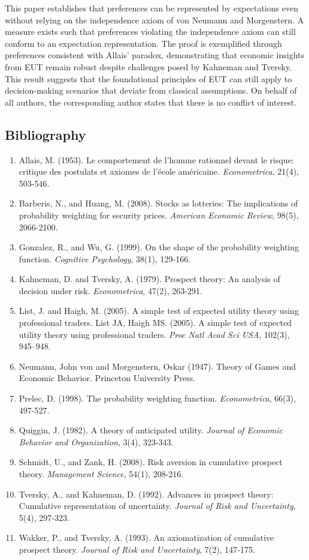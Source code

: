 \documentclass{article}
\begin{document}
This paper establishes that preferences can be represented by expectations even without relying on the independence axiom of von Neumann and Morgenstern. A measure exists such that preferences violating the independence axiom can still conform to an expectation representation. The proof is exemplified through preferences consistent with Allais' paradox, demonstrating that economic insights from EUT remain robust despite challenges posed by Kahneman and Tversky. This result suggests that the foundational principles of EUT can still apply to decision-making scenarios that deviate from classical assumptions.
\newpage
On behalf of all authors, the corresponding author states that there is no conflict of interest.
\subsection*{Bibliography}
\begin{enumerate}
    \item Allais, M. (1953). Le comportement de l'homme rationnel devant le risque: critique des postulats et axiomes de l'école américaine. \textit{Econometrica}, 21(4), 503-546.
    \item Barberis, N., and Huang, M. (2008). Stocks as lotteries: The implications of probability weighting for security prices. \textit{American Economic Review}, 98(5), 2066-2100.
    \item Gonzalez, R., and Wu, G. (1999). On the shape of the probability weighting function. \textit{Cognitive Psychology}, 38(1), 129-166.
    \item Kahneman, D. and Tversky, A. (1979). Prospect theory: An analysis of decision under risk. \textit{Econometrica}, 47(2), 263-291.
    \item List, J. and Haigh, M. (2005).  A simple test of expected utility theory using professional traders.  List JA, Haigh MS. (2005). A simple test of expected utility theory using professional traders. \textit{Proc Natl Acad Sci USA}, 102(3), 945–948.
    \item Neumann, John von and Morgenstern, Oskar (1947). Theory of Games and Economic Behavior. Princeton University Press.
    \item Prelec, D. (1998). The probability weighting function. \textit{Econometrica}, 66(3), 497-527.
    \item Quiggin, J. (1982). A theory of anticipated utility. \textit{Journal of Economic Behavior and Organization}, 3(4), 323-343.
    \item Schmidt, U., and Zank, H. (2008). Risk aversion in cumulative prospect theory. \textit{Management Science}, 54(1), 208-216.
    \item Tversky, A., and Kahneman, D. (1992). Advances in prospect theory: Cumulative representation of uncertainty. \textit{Journal of Risk and Uncertainty}, 5(4), 297-323.
    \item Wakker, P., and Tversky, A. (1993). An axiomatization of cumulative prospect theory. \textit{Journal of Risk and Uncertainty}, 7(2), 147-175.
    
\end{enumerate}
	
\end{document}
